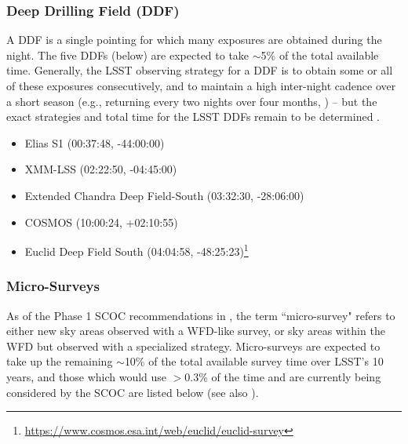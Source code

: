 \documentclass[DM,lsstdoc,toc]{lsstdoc}
\begin{document}
\subsubsection{Deep Drilling Field (DDF)}\label{sssec:terms_sp_ddf}
A DDF is a single pointing for which many exposures are obtained during the night.
The five DDFs (below) are expected to take $\sim$5\% of the total available time.
Generally, the LSST observing strategy for a DDF is to obtain some or all of these exposures consecutively, and to maintain a high inter-night cadence over a short season (e.g., returning every two nights over four months, \citealt{2019ApJ...873..111I}) -- but the exact strategies and total time for the LSST DDFs remain to be determined .

\begin{itemize}
\item Elias S1 (00:37:48, -44:00:00)
\item XMM-LSS (02:22:50, -04:45:00)
\item Extended Chandra Deep Field-South (03:32:30, -28:06:00)
\item COSMOS (10:00:24, +02:10:55)
\item Euclid Deep Field South  (04:04:58, -48:25:23)\footnote{\url{https://www.cosmos.esa.int/web/euclid/euclid-survey}}
\end{itemize}

\subsubsection{Micro-Surveys}\label{sssec:terms_sp_micro}
As of the Phase 1 SCOC recommendations in , the term ``micro-survey" refers to either new sky areas observed with a WFD-like survey, or sky areas within the WFD but observed with a specialized strategy.
Micro-surveys are expected to take up the remaining $\sim$10\% of the total available survey time over LSST's 10 years, and those which would use $>$0.3\% of the time and are currently being considered by the SCOC are listed below (see also ).
\end{document}
